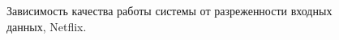 \documentclass[a4paper, 12pt]{article} %
\begin{document}
	\begin{figure}[h!]
	\begin{minipage}[h]{0.49\linewidth}
	\end{minipage}
	\hfill
	\begin{minipage}[h]{0.49\linewidth}
	\end{minipage}
	\caption{Зависимость качества работы системы от разреженности входных данных, Netflix.}
	\label{fig:netflix_accuracy}
	\end{figure}
	\par
\end{document}
